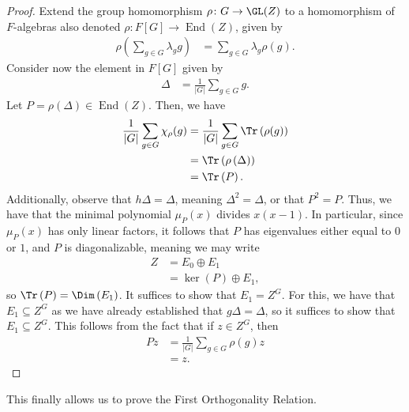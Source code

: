 \documentclass[10pt]{mypackage}
\begin{document}
\begin{proof}
  Extend the group homomorphism $\rho\colon G\rightarrow \GL(Z)$ to a homomorphism of $F$-algebras also denoted $\rho\colon F[G]\rightarrow \operatorname{End}(Z)$, given by
  \begin{align*}
    \rho\left( \sum_{g\in G}\lambda_g g \right) &= \sum_{g\in G}\lambda_g\rho(g).
  \end{align*}
  Consider now the element in $F[G]$ given by
  \begin{align*}
    \Delta &= \frac{1}{\left\vert G \right\vert}\sum_{g\in G}g.
  \end{align*}
  Let $P = \rho\left( \Delta \right)\in \operatorname{End}(Z)$. Then, we have
  \begin{align*}
    \frac{1}{\left\vert G \right\vert}\sum_{g\in G}\chi_{\rho}(g) &= \frac{1}{\left\vert G \right\vert}\sum_{g\in G}\Tr\left( \rho(g) \right)\\
                                                                  &= \Tr\left( \rho\left( \Delta \right) \right)\\
                                                                  &= \Tr\left( P \right).
  \end{align*}
  Additionally, observe that $h\Delta = \Delta$, meaning $\Delta^2 = \Delta$, or that $P^2 = P$. Thus, we have that the minimal polynomial $\mu_P(x)$ divides $x\left( x-1 \right)$. In particular, since $\mu_P(x)$ has only linear factors, it follows that $P$ has eigenvalues either equal to $0$ or $1$, and $P$ is diagonalizable, meaning we may write
  \begin{align*}
    Z &= E_0 \oplus E_1\\
      &= \ker\left( P \right) \oplus E_1,
  \end{align*}
  so $\Tr\left( P \right) = \Dim\left( E_1 \right)$. It suffices to show that $E_1 = Z^{G}$. For this, we have that $E_1\subseteq Z^G$ as we have already established that $g\Delta = \Delta$, so it suffices to show that $E_1\subseteq Z^G$. This follows from the fact that if $z\in Z^G$, then
  \begin{align*}
    Pz &= \frac{1}{\left\vert G \right\vert}\sum_{g\in G}\rho(g)z\\
       &= z.
  \end{align*}
\end{proof}
This finally allows us to prove the First Orthogonality Relation.
\end{document}
